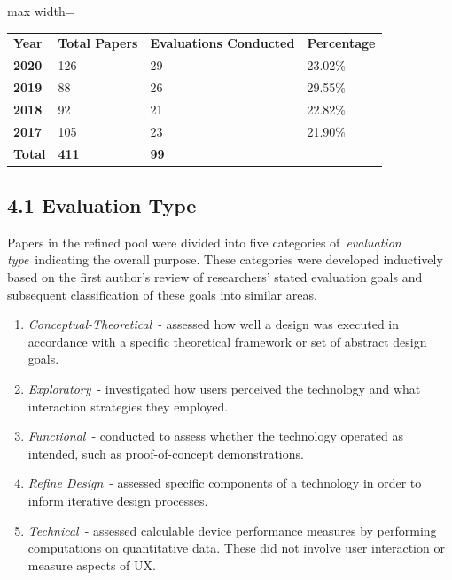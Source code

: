 \documentclass[sigconf]{nimeart}
\begin{document}
{\def\LTcaptype{none} %
\begin{table}[htbp]\centering\small
\begin{adjustbox}{max width=\textwidth}\begin{tabular}{llll}
\toprule\noalign{}
\midrule
\textbf{Year} & \textbf{Total Papers} & \textbf{Evaluations Conducted} & \textbf{Percentage} \\
\textbf{2020} & 126 & 29 & 23.02\% \\
\textbf{2019} & 88 & 26 & 29.55\% \\
\textbf{2018} & 92 & 21 & 22.82\% \\
\textbf{2017} & 105 & 23 & 21.90\% \\
\textbf{Total} & \textbf{411} & \textbf{99} & 
 \\
\bottomrule
\end{tabular}\end{adjustbox}\end{table}
}

\subsection{4.1 Evaluation Type}\label{evaluation-type}

Papers in the refined pool were divided into five categories of~\emph{evaluation type}~indicating the overall purpose. These categories were developed inductively based on the first author's review of researchers' stated evaluation goals and subsequent classification of these goals into similar areas.

\begin{enumerate}
\item
  \emph{Conceptual-Theoretical}~- assessed how well a design was executed in accordance with a specific theoretical framework or set of abstract design goals.
\item
  \emph{Exploratory}~- investigated how users perceived the technology and what interaction strategies they employed.
\item
  \emph{Functional}~- conducted to assess whether the technology operated as intended, such as proof-of-concept demonstrations.
\item
  \emph{Refine Design}~- assessed specific components of a technology in order to inform iterative design processes.
\item
  \emph{Technical}~- assessed calculable device performance measures by performing computations on quantitative data. These did not involve user interaction or measure aspects of UX.
\end{enumerate}
\end{document}

